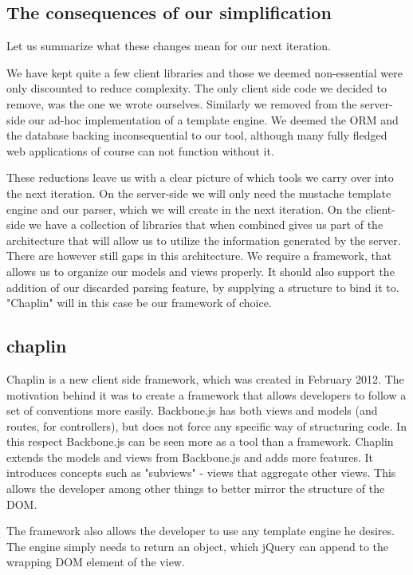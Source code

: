 \subsection{The consequences of our simplification}

Let us summarize what these changes mean for our next iteration.

We have kept quite a few client libraries and those we deemed non-essential were
only discounted to reduce complexity.
The only client side code we decided to remove, was the one we wrote ourselves.
Similarly we removed from the server-side our ad-hoc implementation of a
template engine.
We deemed the ORM and the database backing inconsequential to our tool, although
many fully fledged web applications of course can not function without it.

These reductions leave us with a clear picture of which tools we carry over into
the next iteration.
On the server-side we will only need the mustache template engine
and our parser, which we will create in the next iteration.
On the client-side we have a collection of libraries that when combined gives us
part of the architecture that will allow us to utilize the information generated
by the server.
There are however still gaps in this architecture. We require a framework, that
allows us to organize our models and views properly. It should also support
the addition of our discarded parsing feature, by supplying a structure to bind
it to. "Chaplin" will in this case be our framework of choice.

\subsection{chaplin}
Chaplin is a new client side framework, which was created in February 2012.
The motivation behind it was to create a framework that allows developers to
follow a set of conventions more easily. Backbone.js has both views and models
(and routes, for controllers), but does not force any specific way of
structuring code. In this respect Backbone.js can be seen more as a tool than a
framework.
Chaplin extends the models and views from Backbone.js and adds more features.
It introduces concepts such as "subviews" - views that aggregate other views.
This allows the developer among other things to better mirror the structure of
the DOM.

The framework also allows the developer to use any template engine he desires.
The engine simply needs to return an object, which jQuery can append to the
wrapping DOM element of the view.

